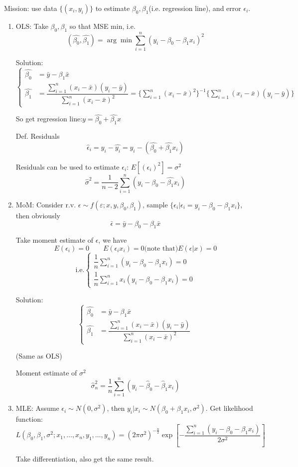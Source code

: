 \documentclass[11pt,a4paper]{ctexart}
\numberwithin{equation}{section}%
\begin{document}
    Mission: use data $\{(x_i,y_i)\}$ to estimate $\beta_0,\beta_1$(i.e. regression line), and error $\epsilon_i$.

    \begin{enumerate}
        \item OLS: Take $\beta_0,\beta_1$  so that MSE min, i.e.
        \[
            (\hat{\beta_0},\hat{\beta_1})=\arg\min\sum_{i=1}^n(y_i-\beta_0-\beta_1 x_i)^2    
        \]

        Solution:
        \[\begin{cases}
            \hat{\beta_0}&=\bar{y}-\beta_1\bar{x}\\
            \hat{\beta_1}&=\dfrac{\sum_{i=1}^n(x_i-\bar{x})(y_i-\bar{y})}{\sum_{i=1}^n(x_i-\bar{x})^2}=\{\sum_{i=1}^n(x_i-\bar{x})^2\}^{-1}\{\sum_{i=1}^n(x_i-\bar{x})(y_i-\bar{y})\}
        \end{cases}\]

        So get regression line:$y=\hat{\beta_0}+\hat{\beta_1}x$

        Def. Residuals
        \[\hat{\epsilon}_i=y_i-\hat{y_i}=y_i-(\hat{\beta_0}+\hat{\beta_1}x_i)\]


        Residuals can be used to estimate $\epsilon_i$: $E[(\epsilon_i)^2]=\sigma^2$
        \[\hat{\sigma}^2=\frac{1}{n-2}\sum_{i=1}^n(y_i-\hat{\beta_0}-\hat{\beta_1}x_i)\]
        \item MoM: Consider r.v. $\epsilon\sim f(\varepsilon;x,y,\beta_0,\beta_1)$, sample $\{\epsilon_i|\epsilon_i=y_i-\beta_0-\beta_1x_i\}$, then obviously
        \[\bar{\epsilon}=\bar{y}-\beta_0-\beta_1\bar{x}\]

        Take moment estimate of $\epsilon$, we have 
        \[E(\epsilon_i)=0\qquad E(\epsilon_i x_i)=0\text{(note that)}E(\epsilon|x)=0\]
        \[\text{i.e.}\begin{cases}
            
            \dfrac{1}{n}\sum_{i=1}^n(y_i-\beta_0-\beta_1x_i)=0\\
            \dfrac{1}{n}\sum_{i=1}^nx_i(y_i-\beta_0-\beta_1x_i)=0
        \end{cases}\]

        Solution:
        \[\begin{cases}
            \hat{\beta_0}&=\bar{y}-\beta_1\bar{x}\\
            \hat{\beta_1}&=\dfrac{\sum_{i=1}^n(x_i-\bar{x})(y_i-\bar{y})}{\sum_{i=1}^n(x_i-\bar{x})^2}
        \end{cases}\]

        (Same as OLS)

        Moment estimate of $\sigma^2$
        \[\hat{\sigma}^2_n=\frac{1}{n}\sum_{i=1}^n(y_i-\hat{\beta}_0-\hat{\beta}_1x_i)\]

        \item MLE: Assume $\epsilon_i\sim N(0,\sigma^2)$, then $y_i|x_i\sim N(\beta_0+\beta_1x_i,\sigma^2)$. Get likelihood function:
        \[
            L(\beta_0,\beta_1,\sigma^2;x_1,\ldots,x_n,y_1,\ldots,y_n)=(2\pi\sigma^2)^{-\frac{n}{2}}\exp\left[-\frac{\sum_{i=1}^n(y_i-\beta_0-\beta_1x_i)}{2\sigma^2}\right]  
        \]

        Take differentiation, also get the same result.
    \end{enumerate}
\end{document}

